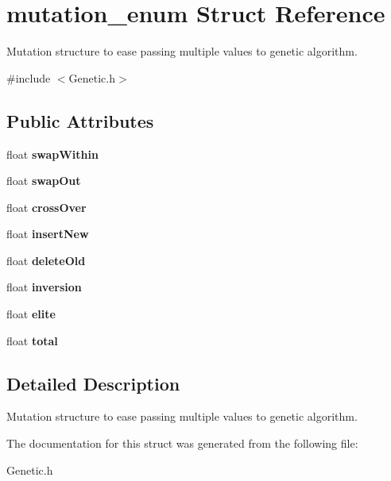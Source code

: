 \hypertarget{structmutation__enum}{}\section{mutation\+\_\+enum Struct Reference}
\label{structmutation__enum}


Mutation structure to ease passing multiple values to genetic algorithm.  




{\ttfamily \#include $<$Genetic.\+h$>$}

\subsection*{Public Attributes}
\begin{DoxyCompactItemize}
\item 
float {\bfseries swap\+Within}\hypertarget{structmutation__enum_a9ad45c9724e5239c17cea93a4fb1e4ff}{}\label{structmutation__enum_a9ad45c9724e5239c17cea93a4fb1e4ff}

\item 
float {\bfseries swap\+Out}\hypertarget{structmutation__enum_a822b0168877f09ae2ca1f870105d1b93}{}\label{structmutation__enum_a822b0168877f09ae2ca1f870105d1b93}

\item 
float {\bfseries cross\+Over}\hypertarget{structmutation__enum_acd59e8de673a33b90509dfa3d672e5cd}{}\label{structmutation__enum_acd59e8de673a33b90509dfa3d672e5cd}

\item 
float {\bfseries insert\+New}\hypertarget{structmutation__enum_af5e0f1f6fe8d7921f2012b07a1604b93}{}\label{structmutation__enum_af5e0f1f6fe8d7921f2012b07a1604b93}

\item 
float {\bfseries delete\+Old}\hypertarget{structmutation__enum_a2527c153f4471934319e26e7187a3460}{}\label{structmutation__enum_a2527c153f4471934319e26e7187a3460}

\item 
float {\bfseries inversion}\hypertarget{structmutation__enum_a3fe358eb996766cdb08f483fa7edfd98}{}\label{structmutation__enum_a3fe358eb996766cdb08f483fa7edfd98}

\item 
float {\bfseries elite}\hypertarget{structmutation__enum_aaf4522a5db9a7176664dbb58bb8b587f}{}\label{structmutation__enum_aaf4522a5db9a7176664dbb58bb8b587f}

\item 
float {\bfseries total}\hypertarget{structmutation__enum_a0563b544d3842242b33635c37c9b1dcf}{}\label{structmutation__enum_a0563b544d3842242b33635c37c9b1dcf}

\end{DoxyCompactItemize}


\subsection{Detailed Description}
Mutation structure to ease passing multiple values to genetic algorithm. 

The documentation for this struct was generated from the following file\+:\begin{DoxyCompactItemize}
\item 
Genetic.\+h\end{DoxyCompactItemize}
